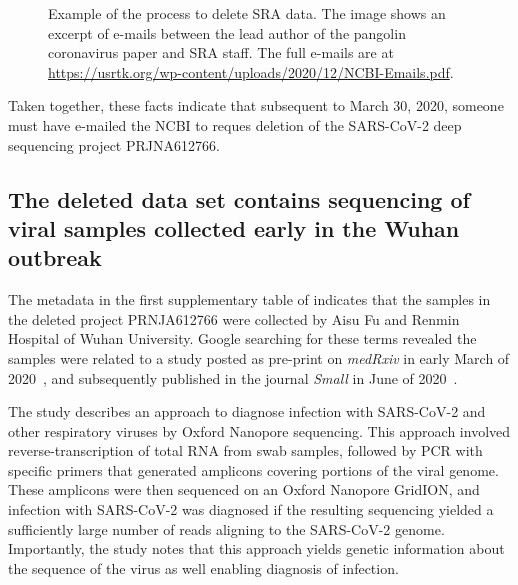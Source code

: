 \documentclass[9pt,twocolumn,twoside]{gsajnl_modified}
\begin{document}
\begin{figure}[]
\centering
{}
\caption{Example of the process to delete SRA data.
The image shows an excerpt of e-mails between the lead author of the pangolin coronavirus paper \citet{xiao2020isolation} and SRA staff.
The full e-mails are at \url{https://usrtk.org/wp-content/uploads/2020/12/NCBI-Emails.pdf}.
}
\label{fig:pangolin_emails}
\end{figure}

Taken together, these facts indicate that subsequent to March 30, 2020, someone must have e-mailed the NCBI to reques deletion of the SARS-CoV-2 deep sequencing project PRJNA612766.

\subsection{The deleted data set contains sequencing of viral samples collected early in the Wuhan outbreak}
The metadata in the first supplementary table of \citet{farkas2020insights} indicates that the samples in the deleted project PRNJA612766 were collected by Aisu Fu and Renmin Hospital of Wuhan University.
Google searching for these terms revealed the samples were related to a study posted as pre-print on \textit{medRxiv} in early March of 2020~\citep{Wang2020medRxiv}, and subsequently published in the journal \textit{Small} in June of 2020~\citep{Wang2020small}.

The study describes an approach to diagnose infection with SARS-CoV-2 and other respiratory viruses by Oxford Nanopore sequencing.
This approach involved reverse-transcription of total RNA from swab samples, followed by PCR with specific primers that generated amplicons covering portions of the viral genome.
These amplicons were then sequenced on an Oxford Nanopore GridION, and infection with SARS-CoV-2 was diagnosed if the resulting sequencing yielded a sufficiently large number of reads aligning to the SARS-CoV-2 genome.
Importantly, the study notes that this approach yields genetic information about the sequence of the virus as well enabling diagnosis of infection.
\end{document}
